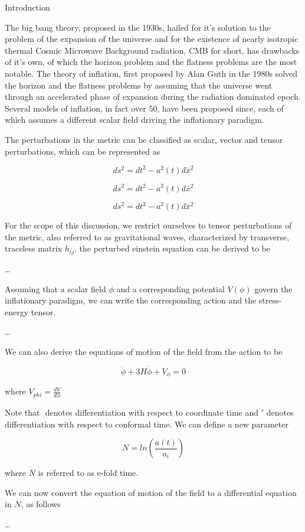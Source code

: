 \documentclass[12pt, a4paper]{report}
\begin{document}
{\noindent \Large{Introduction}}

The big bang theory, proposed in the 1930s, hailed for it's solution to the problem of the expansion of the universe and for the existence of nearly isotropic thermal Cosmic Microwave Background radiation, CMB for short, has drawbacks of it's own, of which the horizon problem and the flatness problems are the most notable. The theory of inflation, first proposed by Alan Guth in the 1980s solved the horizon and the flatness problems by assuming that the universe went through an accelerated phase of expansion during the radiation dominated epoch. Several models of inflation, in fact over 50, have been proposed since, each of which assumes a different scalar field driving the inflationary paradigm.

The perturbations in the metric can be classified as scalar, vector and tensor perturbations, which can be represented as

$$ds^2 = dt^2 - a^2(t)d\bar{x}^2$$

$$ds^2 = dt^2 - a^2(t)d\bar{x}^2$$

$$ds^2 = dt^2 - a^2(t)d\bar{x}^2$$

For the scope of  this discussion, we restrict ourselves to tensor perturbations of the metric, also referred to as gravitational waves, characterized by transverse, traceless matrix $h_{ij}$. the perturbed einstein equation can be derived to be

\ldots

Assuming that a scalar field $\phi$ and a corresponding potential $V(\phi)$ govern the inflationary paradigm, we can write the corresponding action and the stress-energy tensor.

\ldots

We can also derive the equations of motion of the field from the action to be

$$\ddot{\phi} + 3H\dot{\phi} + V_{\phi} = 0$$

where $V_{phi} = \frac{dV}{d\phi}$

Note that $\dot{}$ denotes differentiation with respect to coordinate time and $'$ denotes differentiation with respect to conformal time. We can define a new parameter

$$N = ln(\frac{a(t)}{a_i})$$

where $N$ is referred to as e-fold time.

We can now convert the equation of motion of the field to a differential equation in $N$, as follows

\ldots
\end{document}
